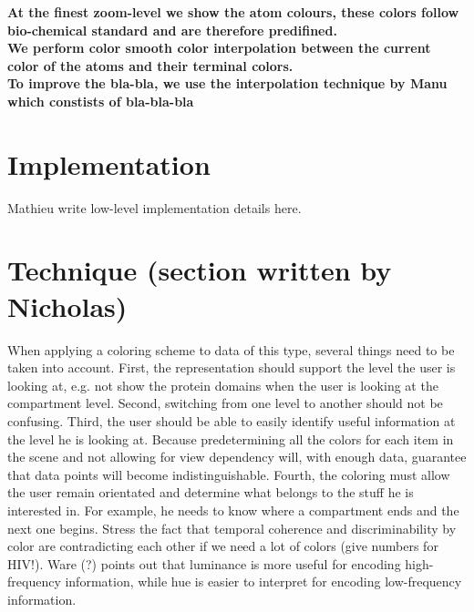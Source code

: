 \documentclass[review,journal]{vgtc}         %
\begin{document}
\textbf{At the finest zoom-level we show the atom colours, these colors follow bio-chemical standard and are therefore predifined. } \\

\textbf{We perform color smooth color interpolation between the current color of the atoms and their terminal colors. } \\
	
\textbf{To improve the bla-bla, we use the interpolation technique by Manu which constists of bla-bla-bla} \\



\section{Implementation}

Mathieu write low-level implementation details here.

%
%
%
%
%
%



\section{Technique (section written by Nicholas)}

When applying a coloring scheme to data of this type, several things need to be taken into account. 
First, the representation should support the level the user is looking at, e.g. not show the protein domains when the user is looking at the compartment level. 
Second, switching from one level to another should not be confusing.
Third, the user should be able to easily identify useful information at the level he is looking at. 
Because predetermining all the colors for each item in the scene and not allowing for view dependency will, with enough data, guarantee that data points will become indistinguishable. 
Fourth, the coloring must allow the user remain orientated and determine what belongs to the stuff he is interested in. 
For example, he needs to know where a compartment ends and the next one begins.
Stress the fact that temporal coherence and discriminability by color are contradicting each other if we need a lot of colors (give numbers for HIV!). 
Ware (?) points out that luminance is more useful for encoding high-frequency information, while hue is easier to interpret for encoding low-frequency information. 
\end{document}
